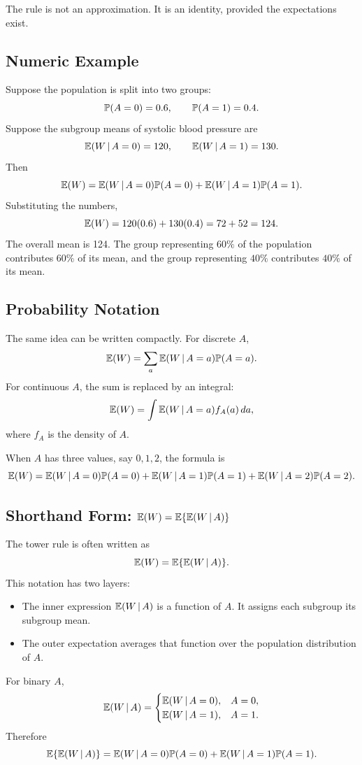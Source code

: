 The rule is not an approximation. It is an identity, provided the expectations exist.

\subsection{Numeric Example}

Suppose the population is split into two groups:
\[
\mathbb{P}(A=0)=0.6,\qquad \mathbb{P}(A=1)=0.4.
\]
Suppose the subgroup means of systolic blood pressure are
\[
\mathbb{E}(W\,\vert\, A=0)=120,
\qquad
\mathbb{E}(W\,\vert\, A=1)=130.
\]
Then
\[
\mathbb{E}(W)
=\mathbb{E}(W\,\vert\, A=0)\mathbb{P}(A=0)
+\mathbb{E}(W\,\vert\, A=1)\mathbb{P}(A=1).
\]
Substituting the numbers,
\[
\mathbb{E}(W)
=120(0.6)+130(0.4)
=72+52
=124.
\]
The overall mean is 124. The group representing $60\%$ of the population contributes $60\%$ of its mean, and the group representing $40\%$ contributes $40\%$ of its mean.

\subsection{Probability Notation}

The same idea can be written compactly. For discrete $A$,
\[
\mathbb{E}(W)=\sum_a \mathbb{E}(W\,\vert\, A=a)\mathbb{P}(A=a).
\]
For continuous $A$, the sum is replaced by an integral:
\[
\mathbb{E}(W)=\int \mathbb{E}(W\,\vert\, A=a) f_A(a)\,da,
\]
where $f_A$ is the density of $A$.

When $A$ has three values, say $0,1,2$, the formula is
\[
\mathbb{E}(W)
=
\mathbb{E}(W\,\vert\, A=0)\mathbb{P}(A=0)
+\mathbb{E}(W\,\vert\, A=1)\mathbb{P}(A=1)
+\mathbb{E}(W\,\vert\, A=2)\mathbb{P}(A=2).
\]

\subsection{Shorthand Form: $\mathbb{E}(W)=\mathbb{E}\{\mathbb{E}(W\,\vert\, A)\}$}

The tower rule is often written as
\[
\mathbb{E}(W)=\mathbb{E}\{\mathbb{E}(W\,\vert\, A)\}.
\]
This notation has two layers:
\begin{itemize}
  \item The inner expression $\mathbb{E}(W\,\vert\, A)$ is a function of $A$. It assigns each subgroup its subgroup mean.
  \item The outer expectation averages that function over the population distribution of $A$.
\end{itemize}

For binary $A$,
\[
\mathbb{E}(W\,\vert\, A)
=
\begin{cases}
\mathbb{E}(W\,\vert\, A=0), & A=0,\\
\mathbb{E}(W\,\vert\, A=1), & A=1.
\end{cases}
\]
Therefore
\[
\mathbb{E}\{\mathbb{E}(W\,\vert\, A)\}
=
\mathbb{E}(W\,\vert\, A=0)\mathbb{P}(A=0)
+\mathbb{E}(W\,\vert\, A=1)\mathbb{P}(A=1).
\]

